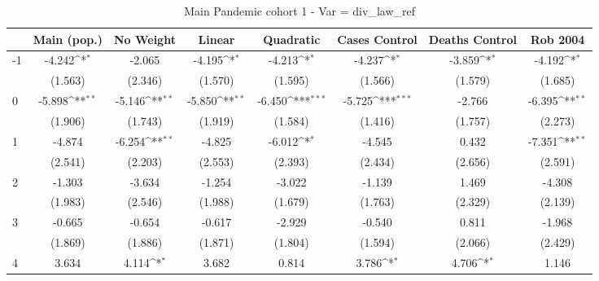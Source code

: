 \documentclass{article}
\begin{document}
{
\def\sym#1{\ifmmode^{#1}\else\(^{#1}\)\fi}
\begin{longtable}{l*{7}{c}}
\caption{Main Pandemic cohort 1 - Var = div\_law\_ref}\\
\hline\hline\endfirsthead\hline\endhead\hline\endfoot\endlastfoot
                &\multicolumn{1}{c}{Main (pop.)}&\multicolumn{1}{c}{No Weight}&\multicolumn{1}{c}{Linear}&\multicolumn{1}{c}{Quadratic}&\multicolumn{1}{c}{Cases Control}&\multicolumn{1}{c}{Deaths Control}&\multicolumn{1}{c}{Rob 2004}\\
\hline
-1              &   -4.242\sym{*}  &   -2.065         &   -4.195\sym{*}  &   -4.213\sym{*}  &   -4.237\sym{*}  &   -3.859\sym{*}  &   -4.192\sym{*}  \\
                &  (1.563)         &  (2.346)         &  (1.570)         &  (1.595)         &  (1.566)         &  (1.579)         &  (1.685)         \\
0               &   -5.898\sym{**} &   -5.146\sym{**} &   -5.850\sym{**} &   -6.450\sym{***}&   -5.725\sym{***}&   -2.766         &   -6.395\sym{**} \\
                &  (1.906)         &  (1.743)         &  (1.919)         &  (1.584)         &  (1.416)         &  (1.757)         &  (2.273)         \\
1               &   -4.874         &   -6.254\sym{**} &   -4.825         &   -6.012\sym{*}  &   -4.545         &    0.432         &   -7.351\sym{**} \\
                &  (2.541)         &  (2.203)         &  (2.553)         &  (2.393)         &  (2.434)         &  (2.656)         &  (2.591)         \\
2               &   -1.303         &   -3.634         &   -1.254         &   -3.022         &   -1.139         &    1.469         &   -4.308         \\
                &  (1.983)         &  (2.546)         &  (1.988)         &  (1.679)         &  (1.763)         &  (2.329)         &  (2.139)         \\
3               &   -0.665         &   -0.654         &   -0.617         &   -2.929         &   -0.540         &    0.811         &   -1.968         \\
                &  (1.869)         &  (1.886)         &  (1.871)         &  (1.804)         &  (1.594)         &  (2.066)         &  (2.429)         \\
4               &    3.634         &    4.114\sym{*}  &    3.682         &    0.814         &    3.786\sym{*}  &    4.706\sym{*}  &    1.146         \\

\end{longtable}}
\end{document}
